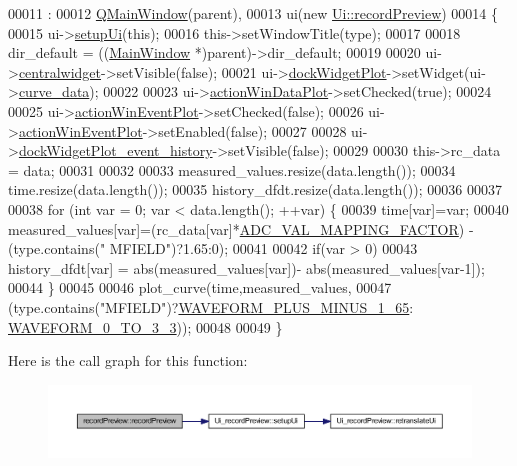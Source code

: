 \begin{DoxyCode}
00011                                                                                 :
00012     \hyperlink{a00058}{QMainWindow}(parent),
00013     ui(\textcolor{keyword}{new} \hyperlink{a00074}{Ui::recordPreview})
00014 \{
00015     ui->\hyperlink{a00081_afa41dc070a896a5eae476f3c0206825c}{setupUi}(\textcolor{keyword}{this});
00016     this->setWindowTitle(type);
00017 
00018     dir\_default = ((\hyperlink{a00017}{MainWindow} *)parent)->dir\_default;
00019 
00020     ui->\hyperlink{a00081_ac9ab4609922159e8e4cc45905f76928e}{centralwidget}->setVisible(\textcolor{keyword}{false});
00021     ui->\hyperlink{a00081_a07b76f17803ec09e0367b72938bbd097}{dockWidgetPlot}->setWidget(ui->\hyperlink{a00081_a247d94481323c0bc4f8b6458a8a535dd}{curve\_data});
00022 
00023     ui->\hyperlink{a00081_aa09067a9c96c9cd78f75261a9fcb89f0}{actionWinDataPlot}->setChecked(\textcolor{keyword}{true});
00024 
00025     ui->\hyperlink{a00081_ac72ec9c8679d46fd43a87f99ee6db893}{actionWinEventPlot}->setChecked(\textcolor{keyword}{false});
00026     ui->\hyperlink{a00081_ac72ec9c8679d46fd43a87f99ee6db893}{actionWinEventPlot}->setEnabled(\textcolor{keyword}{false});
00027 
00028     ui->\hyperlink{a00081_a2a8f7ee8d4458dd20481c8a1c29ce185}{dockWidgetPlot\_event\_history}->setVisible(\textcolor{keyword}{false});
00029 
00030     this->rc\_data = data;
00031 
00032 
00033     measured\_values.resize(data.length());
00034     time.resize(data.length());
00035     history\_dfdt.resize(data.length());
00036 
00037     
00038     \textcolor{keywordflow}{for} (\textcolor{keywordtype}{int} var = 0; var < data.length(); ++var) \{
00039         time[var]=var;
00040         measured\_values[var]=(rc\_data[var]*\hyperlink{a00086_ada92d3eeeec0cbeee41e76a52d145792}{ADC\_VAL\_MAPPING\_FACTOR}) - (type.contains(\textcolor{stringliteral}{"
      MFIELD"})?1.65:0);
00041 
00042         \textcolor{keywordflow}{if}(var > 0)
00043             history\_dfdt[var] = abs(measured\_values[var])- abs(measured\_values[var-1]);
00044     \}
00045 
00046     plot\_curve(time,measured\_values,
00047               (type.contains(\textcolor{stringliteral}{"MFIELD"})?\hyperlink{a00090_a0923d3b365a36e1e8c401cec964aa36f}{WAVEFORM\_PLUS\_MINUS\_1\_65}:
      \hyperlink{a00090_ae18fed2471b16a8516d721ff60671dd9}{WAVEFORM\_0\_TO\_3\_3}));
00048 
00049 \}
\end{DoxyCode}


Here is the call graph for this function\+:
\nopagebreak
\begin{figure}[H]
\begin{center}
\leavevmode
\includegraphics[width=350pt]{d1/d6e/a00073_a03ad4ae83a5594f6dc337c7b71873edd_cgraph}
\end{center}
\end{figure}


